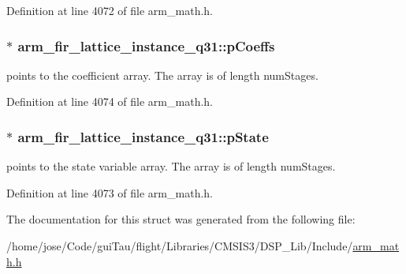 Definition at line 4072 of file arm\-\_\-math.\-h.

\hypertarget{structarm__fir__lattice__instance__q31_a66c3364bf5863cd45e05f1652c3dc522}{
\subsubsection[{p\-Coeffs}]{$\ast$ arm\-\_\-fir\-\_\-lattice\-\_\-instance\-\_\-q31\-::p\-Coeffs}}\label{structarm__fir__lattice__instance__q31_a66c3364bf5863cd45e05f1652c3dc522}
points to the coefficient array. The array is of length num\-Stages. 

Definition at line 4074 of file arm\-\_\-math.\-h.

\hypertarget{structarm__fir__lattice__instance__q31_a08fe9494ab7cd336b791e9657adadcf6}{
\subsubsection[{p\-State}]{$\ast$ arm\-\_\-fir\-\_\-lattice\-\_\-instance\-\_\-q31\-::p\-State}}\label{structarm__fir__lattice__instance__q31_a08fe9494ab7cd336b791e9657adadcf6}
points to the state variable array. The array is of length num\-Stages. 

Definition at line 4073 of file arm\-\_\-math.\-h.



The documentation for this struct was generated from the following file\-:\begin{DoxyCompactItemize}
\item 
/home/jose/\-Code/gui\-Tau/flight/\-Libraries/\-C\-M\-S\-I\-S3/\-D\-S\-P\-\_\-\-Lib/\-Include/\hyperlink{arm__math_8h}{arm\-\_\-math.\-h}\end{DoxyCompactItemize}
